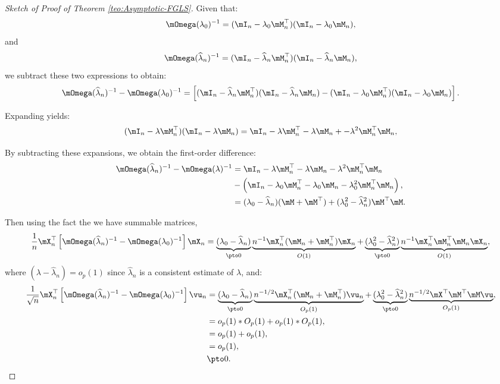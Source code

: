 \begin{proof}[Sketch of Proof of Theorem \ref{teo:Asymptotic-FGLS}]
Given that:
\[
\mOmega(\lambda_0)^{-1} = (\mI_n - \lambda_0\mM_n^\top)(\mI_n - \lambda_0 \mM_n),
\]
%
and
\[
\mOmega(\widehat{\lambda}_n)^{-1} = (\mI_n - \widehat{\lambda}_n \mM_n^\top)(\mI_n - \widehat{\lambda}_n \mM_n),
\]
%
we subtract these two expressions to obtain:
\[
\mOmega(\widehat{\lambda}_n)^{-1} - \mOmega(\lambda_0)^{-1} = \left[ (\mI_n - \widehat{\lambda}_n \mM_n^\top)(\mI_n - \widehat{\lambda}_n \mM_n) - (\mI_n - \lambda_0\mM_n^\top)(\mI_n - \lambda_0\mM_n) \right].
\]

Expanding yields:
\[
(\mI_n - \lambda \mM_n^\top)(\mI_n - \lambda \mM_n) = \mI_n - \lambda \mM_n^\top - \lambda \mM_n +-\lambda^2\mM_n^\top\mM_n,
\]

By subtracting these expansions, we obtain the first-order difference:
\begin{equation*}
\begin{aligned}
\mOmega(\widehat{\lambda}_n)^{-1} - \mOmega(\lambda)^{-1} & =  \mI_n - \lambda \mM_n^\top - \lambda \mM_n-\lambda^2\mM_n^\top\mM_n  \\
& - \left(\mI_n - \lambda_0 \mM_n^\top - \lambda_0 \mM_n -\lambda^2_0\mM_n^\top\mM_n\right), \\
& = (\lambda_0 - \widehat{\lambda}_n)(\mM + \mM^\top) + (\lambda^2_0 - \widehat{\lambda}_n^2)\mM^\top\mM.
\end{aligned}
\end{equation*}

Then using the fact the we have summable matrices, 
\begin{equation*}
  \frac{1}{n}\mX^\top_n\left[\mOmega(\widehat{\lambda}_n)^{-1}- \mOmega(\lambda_0)^{-1}\right]\mX_n = \underbrace{(\lambda_0 - \widehat{\lambda}_n)}_{\pto 0}\underbrace{n^{-1}\mX^\top_n(\mM_n + \mM^\top_n)\mX_n}_{O(1)} + \underbrace{(\lambda^2_0 - \widehat{\lambda}_n^2)}_{\pto 0}\underbrace{n^{-1}\mX^\top_n\mM^\top_n\mM_n\mX_n}_{O(1)},
\end{equation*}
%
where $(\lambda - \widehat{\lambda}_n)=o_p(1)$ since $\widehat{\lambda}_n$ is a consistent estimate of $\lambda$, and:
\begin{equation}
  \begin{aligned}
  \frac{1}{\sqrt{n}}\mX^\top_n\left[\mOmega(\widehat{\lambda}_n)^{-1}- \mOmega(\lambda_0)^{-1}\right]\vu_n & = \underbrace{(\lambda_0 - \widehat{\lambda}_n)}_{\pto 0}\underbrace{n^{-1/2}\mX^\top_n(\mM_n + \mM^\top_n)\vu_n}_{O_p(1)} + \underbrace{(\lambda^2_0 - \widehat{\lambda}_n^2)}_{\pto 0}\underbrace{n^{-1/2}\mX^\top\mM^\top\mM\vu}_{O_p(1)}, \\
  & =  o_p(1)*O_p(1) + o_p(1)*O_p(1), \\
  & = o_p(1) + o_p(1), \\
  & = o_p(1), \\
  & \pto 0.
  \end{aligned}
\end{equation}


\end{proof}
